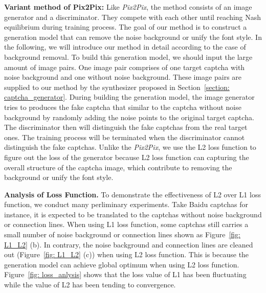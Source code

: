 \noindent \textbf{Variant method of Pix2Pix:}
Like \emph{Pix2Pix}, the method consists of an image generator and a discriminator. They compete with each other until reaching Nash equilibrium during training process. The goal of our method is to construct a generation model that can remove the noise background or unify the font style. In the following, we will introduce our method in detail according to the case of background removal. To build this generation model, we should input the large amount of image pairs. One image pair comprises of one target captcha with noise background and one without noise background. These image pairs are supplied to our method by the synthesizer proposed in Section~\ref{section: captcha_generator}. During building the generation model, the image generator tries to produces the fake captcha that similar to the captcha without noise background by randomly adding the noise points to the original target captcha. The discriminator then will distinguish the fake captchas from the real target ones. The training process will be terminated when the discriminator cannot distinguish the fake captchas. Unlike the \emph{Pix2Pix}, we use the L2 loss function to figure out the loss of the generator because L2 loss function can capturing the overall structure of the captcha image, which contribute to removing the background or unify the font style.

\noindent \textbf{Analysis of Loss Function.}
To demonstrate the effectiveness of L2 over L1 loss function, we conduct many perliminary experiments. Take Baidu captchas for instance, it is expected to be translated to the captchas without noise background or connection lines. When using L1 loss function, some captchas still carries a small number of noise background or connection lines shown as Figure~\ref{fig: L1_L2} (b). In contrary, the noise background and connection lines are cleaned out (Figure~\ref{fig: L1_L2} (c)) when using L2 loss function. This is because the generation model can achieve global optimum when using L2 loss function. Figure~\ref{fig: loss_anlysis} shows that the loss value of L1 has been fluctuating while the value of L2 has been tending to convergence.

